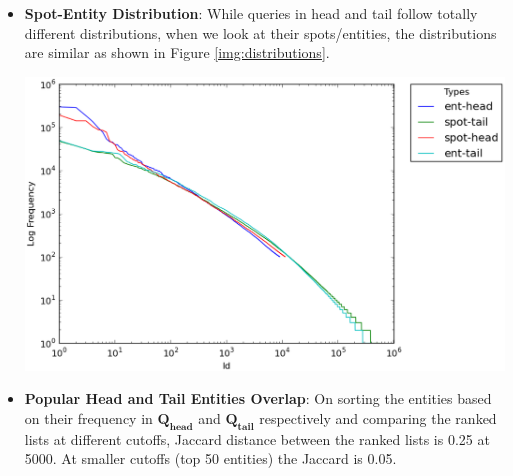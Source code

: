 \documentclass[a0,portrait,final]{a0poster}
\newcommand{\tail}[1]{$\mathbf{Q_{tail}}${}}
\newcommand{\head}[1]{$\mathbf{Q_{head}}${}}
\begin{document}
\begin{multicols}{2}
\begin {itemize}

	\item {\textbf{Spot-Entity Distribution}:} While queries in head and tail follow totally different distributions, when we 		look at their spots/entities, the distributions are similar as shown in Figure \ref{img:distributions}.  
		\vspace{10mm}
		\begin{center}
		\includegraphics[width=0.6\columnwidth]{img/head-tail-ent-spot-dist.eps}
		\label{img:distributions}
		\end{center}

	\item {\textbf{Popular Head and Tail Entities Overlap}:} On sorting the entities based on their frequency in \head{} 		and \tail{} respectively and comparing the ranked lists at different cutoffs, Jaccard distance between the ranked lists is 		0.25 at 5000. At smaller cutoffs (top 50 entities) the Jaccard is 0.05. 
	

\end{itemize}
\end{multicols}
\end{document}
